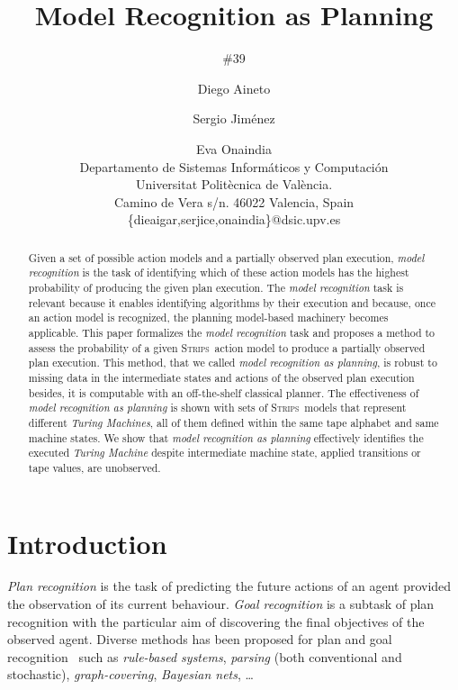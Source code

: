 \documentclass[letterpaper]{article} %
\newcommand{\strips}{\textsc{Strips}}     %
\begin{document}
\title{Model Recognition as Planning}
\author{\#39}


\author{Diego Aineto\and Sergio Jim\'enez\and Eva Onaindia\\
{\small Departamento de Sistemas Inform\'aticos y Computaci\'on}\\
{\small Universitat Polit\`ecnica de Val\`encia.}\\
{\small Camino de Vera s/n. 46022 Valencia, Spain}\\
{\small \{dieaigar,serjice,onaindia\}@dsic.upv.es}}

\maketitle
\begin{abstract} 
Given a set of possible action models and a partially observed plan execution, {\em model recognition} is the task of identifying which of these action models has the highest probability of producing the given plan execution. The {\em model recognition} task is relevant because it enables identifying algorithms by their execution and because, once an action model is recognized, the planning model-based machinery becomes applicable. This paper formalizes the {\em model recognition} task and proposes a method to assess the probability of a given \strips\ action model to produce a partially observed plan execution. This method, that we called {\em model recognition as planning}, is robust to missing data in the intermediate states and actions of the observed plan execution besides, it is computable with an off-the-shelf classical planner. The effectiveness of {\em model recognition as planning} is shown with sets of \strips\ models that represent different {\em Turing Machines}, all of them defined within the same tape alphabet and same machine states. We show that {\em model recognition as planning} effectively identifies the executed {\em Turing Machine} despite intermediate machine state, applied transitions or tape values, are unobserved.
\end{abstract}


\section{Introduction}
\label{sec:introduction}
{\em Plan recognition} is the task of predicting the future actions of an agent provided the observation of its current behaviour. {\em Goal recognition} is a subtask of plan recognition with the particular aim of discovering the final objectives of the observed agent. Diverse methods has been proposed for plan and goal recognition~\cite{carberry2001techniques} such as {\em rule-based systems},  {\em parsing}  (both  conventional and stochastic), {\em graph-covering}, {\em Bayesian nets}, \ldots
\end{document}
